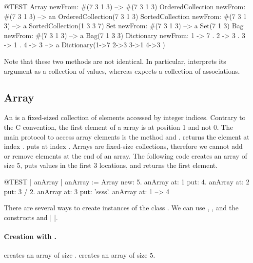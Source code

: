 \documentclass[a4paper,10pt,twoside]{book}
\begin{document}
\begin{code}{@TEST}
Array newFrom: #(7 3 1 3)                                          --> #(7 3 1 3)
OrderedCollection newFrom: #(7 3 1 3)                     --> an OrderedCollection(7 3 1 3)
SortedCollection newFrom: #(7 3 1 3)                       --> a SortedCollection(1 3 3 7)
Set newFrom: #(7 3 1 3)                                            --> a Set(7 1 3)
Bag newFrom: #(7 3 1 3)                                           --> a Bag(7 1 3 3)
Dictionary newFrom: {1 -> 7 . 2 -> 3 . 3 -> 1 . 4 -> 3} --> a Dictionary(1->7 2->3 3->1 4->3 )
\end{code}
\noindent
Note that these two methods are not identical.
In particular,  interprets its argument as a collection of values, whereas  expects a collection of associations.

\subsection{Array}
An  is a fixed-sized collection of elements accessed by integer indices.
Contrary to the C convention, the first element of a \st array is at position 1 and not 0.
The main protocol to access array elements is the method  and .
 returns the element at index .
 puts  at index .
Arrays are fixed-size collections, therefore we cannot add or remove elements at the end of an array.
The following code creates an array of size 5, puts values in the first 3 locations, and returns the first element.

\begin{code}{@TEST | anArray | }
anArray := Array new: 5.
anArray at: 1 put: 4.
anArray at: 2 put: 3 / 2.
anArray at: 3 put: 'ssss'.
anArray at: 1 --> 4
\end{code}

There are several ways to create instances of the class .
We can use , , and  the constructs \ct{#( )} and \ct|{ }|.

\paragraph{Creation with .}  creates an array of size .
 creates an array of size 5.
\end{document}
